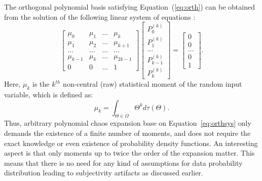 The orthogonal polynomial basis satisfying Equation~(\ref{eq:orth}) can be obtained from the solution of the following linear system of equations \cite{oladyshkin2011concept}: 
%
\begin{equation}
\left[\begin{array}{cccc}
\mu_{0} & \mu_{1} & ... & \mu_{k}\\
\mu_{1} & \mu_{2} & ... & \mu_{k+1}\\
... & ... & ... & ...\\
\mu_{k-1} & \mu_{k} & ... & \mu_{2k-1}\\
0 & 0 & ... & 1\end{array}\right]\left[\begin{array}{c}
P_{0}^{(k)}\\
P_{1}^{(k)}\\
...\\
P_{k-1}^{(k)}\\
P_{k}^{(k)}\end{array}\right]=\left[\begin{array}{c}
0\\
0\\
...\\
0\\
1\end{array}\right].\label{eq:orthsys}\end{equation}
Here, $\mu_{k}$ is the $k^{th}$ non-central (raw) statistical moment of the random input variable, which is defined as:
%
\begin{equation}
\mu_{k}=\int_{\Theta\in\Omega}\Theta^{k}d\tau(\Theta).\label{eq:mnt}
\end{equation}
%
Thus, arbitrary polynomial chaos expansion base on Equation~\ref{eq:orthsys}
only
demands the existence of a finite number of moments, and does not require the
exact knowledge or even existence of probability density functions. An
interesting aspect is that only moments up to twice the order of the expansion
matter. This means that there is no need for any kind of assumptions for data
probability distribution leading to subjectivity artifacts as discussed earlier.

